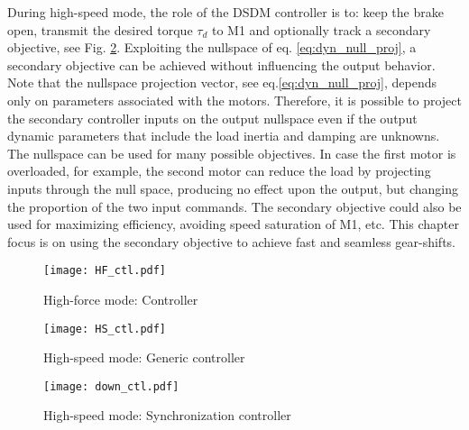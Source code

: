 During high-speed mode, the role of the DSDM controller is to: keep the brake open, transmit the desired torque $\tau_d$ to M1 and optionally track a secondary objective, see Fig. \ref{fig:HS_loop}. Exploiting the nullspace of eq. \eqref{eq:dyn_null_proj}, a secondary objective can be achieved without influencing the output behavior. Note that the nullspace projection vector, see eq.\eqref{eq:dyn_null_proj}, depends only on parameters associated with the motors. Therefore, it is possible to project the secondary controller inputs on the output nullspace even if the output dynamic parameters that include the load inertia and damping are unknowns. 
%
The nullspace can be used for many possible objectives. In case the first motor is overloaded, for example, the second motor can reduce the load by projecting inputs through the null space, producing no effect upon the output, but changing the proportion of the two input commands. The secondary objective could also be used for maximizing efficiency, avoiding speed saturation of M1, etc. This chapter focus is on using the secondary objective to achieve fast and seamless gear-shifts.



\begin{figure}[p]
	\centering
		\texttt{[image: HF\_ctl.pdf]}
	\caption{High-force mode: Controller}
	\label{fig:HF_loop}
\end{figure}

\begin{figure}[p]
	\centering
		\texttt{[image: HS\_ctl.pdf]}
	\caption{High-speed mode: Generic controller}
	\label{fig:HS_loop}
\end{figure}

\begin{figure}[p]
	\centering
		\texttt{[image: down\_ctl.pdf]}
	\caption{High-speed mode: Synchronization controller}
	\label{fig:down_loop}
\end{figure}


